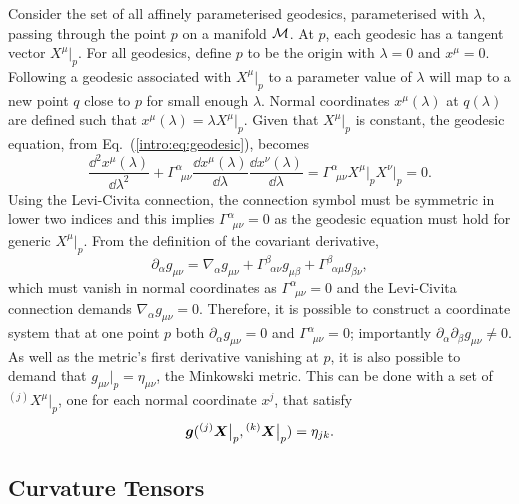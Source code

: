 Consider the set of all affinely parameterised geodesics, parameterised with $\lambda$, passing through the point $p$ on a manifold $\mathcal{M}$. At $p$, each geodesic has a tangent vector $X^\mu\big|_p$. For all geodesics, define $p$ to be the origin with $\lambda=0$ and $x^\mu=0$. Following a geodesic associated with $X^\mu\big|_p$ to a parameter value of $\lambda$ will map to a new point $q$ close to $p$ for small enough $\lambda$. Normal coordinates $x^\mu(\lambda)$ at $q(\lambda)$ are defined such that $x^\mu(\lambda) = \lambda X^\mu\big|_p$. Given that $X^\mu\big|_p$ is constant, the geodesic equation, from Eq.~(\ref{intro:eq:geodesic}), becomes 
\begin{equation}
\frac{\dd ^2 x^\mu(\lambda)}{\dd \lambda^2} +  \Gamma^\alpha_{\,\,\,\mu\nu} \frac{\dd x^\mu(\lambda)}{\dd \lambda}  \frac{\dd x^\nu(\lambda)}{\dd \lambda} = \Gamma^\alpha_{\,\,\,\mu\nu}X^\mu\big|_p  X^\nu\big|_p =0.
\end{equation}
Using the Levi-Civita connection, the connection symbol must be symmetric in lower two indices and this implies $\Gamma^\alpha_{\,\,\,\mu\nu}=0$ as the geodesic equation must hold for generic $X^\mu\big|_p$. From the definition of the covariant derivative, 
\begin{equation}
\partial_\alpha g_{\mu\nu} = \nabla_\alpha g_{\mu\nu} + \Gamma^{\beta}_{\,\,\,\alpha\nu}g_{\mu\beta} + \Gamma^{\beta}_{\,\,\,\alpha\mu}g_{\beta \nu},
\end{equation}
which must vanish in normal coordinates as $\Gamma^\alpha_{\,\,\,\mu\nu}=0$ and the Levi-Civita connection demands $\nabla_\alpha g_{\mu\nu}=0$. Therefore, it is possible to construct a coordinate system that at one point $p$ both $\partial_\alpha g_{\mu\nu}=0$ and $\Gamma^\alpha_{\,\,\,\mu\nu}=0$; importantly $\partial_\alpha \partial_\beta g_{\mu\nu}\neq 0$. As well as the metric's first derivative vanishing at $p$, it is also possible to demand that $g_{\mu\nu}\big|_p = \eta_{\mu\nu}$, the Minkowski metric. This can be done with a set of ${}^{(j)}X^\mu \big|_p$, one for each normal coordinate $x^j$, that satisfy 
\begin{equation} \boldsymbol{g}({}^{(j)}\boldsymbol{X}\big|_p , {}^{(k)}\boldsymbol{X}\big|_p) = \eta_{jk}. \end{equation}







\subsection{Curvature Tensors}\label{intro:sec:curvature}

